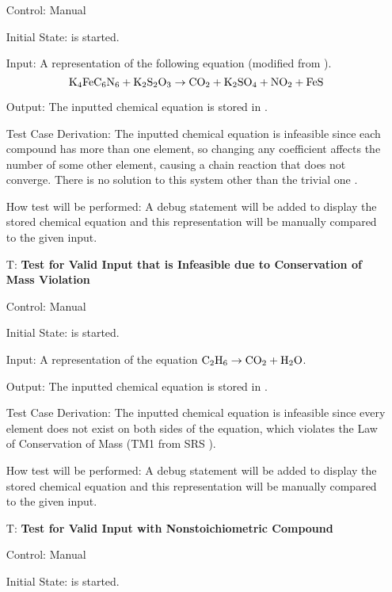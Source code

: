 \documentclass[12pt, titlepage]{article}
\newcounter{testnum} %
\begin{document}
\begin{enumerate}
    Control: Manual

    Initial State: \progname{} is started.

    Input: A representation of the following equation (modified from
    \cite{hamid_balancing_2019}).
    $$\ce{K4FeC6N6} + \ce{K2S2O3} \rightarrow \ce{CO2} + \ce{K2SO4} + \ce{NO2} +
      \ce{FeS}$$

    Output: The inputted chemical equation is stored in \progname{}.

    Test Case Derivation: The inputted chemical equation is infeasible since
    each compound has more than one element, so changing any coefficient
    affects the number of some other element, causing a chain reaction that
    does not converge. There is no solution to this system other than the
    trivial one \cite{hamid_balancing_2019}.

    How test will be performed: A debug statement will be added to display the
    stored chemical equation and this representation will be manually compared to
    the given input.

  \item[T\refstepcounter{testnum}\thetestnum \label{test_inf_cons_mass_valid_input}:]
    \textbf{Test for Valid Input that is Infeasible due to Conservation of Mass
      Violation}

    Control: Manual

    Initial State: \progname{} is started.

    Input: A representation of the equation
    $\ce{C2H6} \rightarrow \ce{CO2} + \ce{H2O}$.

    Output: The inputted chemical equation is stored in \progname{}.

    Test Case Derivation: The inputted chemical equation is infeasible since
    every element does not exist on both sides of the equation, which violates
    the Law of Conservation of Mass (TM1 from SRS ).

    How test will be performed: A debug statement will be added to display the
    stored chemical equation and this representation will be manually compared to
    the given input.

  \item[T\refstepcounter{testnum}\thetestnum \label{test_nonstoich_valid_input}:]
    \textbf{Test for Valid Input with Nonstoichiometric Compound}

    Control: Manual

    Initial State: \progname{} is started.


\end{enumerate}
\end{document}
